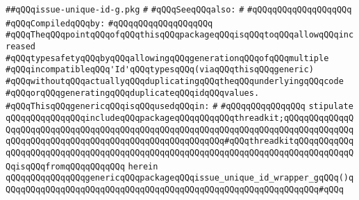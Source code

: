 \label{src/lib/src/issue-unique-id-wrapper-g.pkg}
\verb|##qQQqissue-unique-id-g.pkg|\newline
\verb|#|\newline
\verb|#qQQqSeeqQQqalso:|\newline
\verb|#|\newline
\verb|#qQQqqQQqqQQqqQQqqQQq|\newline
\newline
\verb|#qQQqCompiledqQQqby:|\newline
\verb|#qQQqqQQqqQQqqQQqqQQq|\newline
\newline
\newline
\verb|#qQQqTheqQQqpointqQQqofqQQqthisqQQqpackageqQQqisqQQqtoqQQqallowqQQqincreased|\newline
\verb|#qQQqtypesafetyqQQqbyqQQqallowingqQQqgenerationqQQqofqQQqmultiple|\newline
\verb|#qQQqincompatibleqQQq'Id'qQQqtypesqQQq(viaqQQqthisqQQqgeneric)|\newline
\verb|#qQQqwithoutqQQqactuallyqQQqduplicatingqQQqtheqQQqunderlyingqQQqcode|\newline
\verb|#qQQqorqQQqgeneratingqQQqduplicateqQQqidqQQqvalues.|\newline
\newline
\verb|#qQQqThisqQQqgenericqQQqisqQQqusedqQQqin:|\newline
\verb|#|\newline
\verb|#qQQqqQQqqQQqqQQq|\newline
\newline
\verb|stipulate|\newline
\verb|qQQqqQQqqQQqqQQqincludeqQQqpackageqQQqqQQqqQQqthreadkit;qQQqqQQqqQQqqQQqqQQqqQQqqQQqqQQqqQQqqQQqqQQqqQQqqQQqqQQqqQQqqQQqqQQqqQQqqQQqqQQqqQQqqQQqqQQqqQQqqQQqqQQqqQQqqQQqqQQqqQQqqQQqqQQq#qQQqthreadkitqQQqqQQqqQQqqQQqqQQqqQQqqQQqqQQqqQQqqQQqqQQqqQQqqQQqqQQqqQQqqQQqqQQqqQQqqQQqqQQqqQQqisqQQqfromqQQqqQQqqQQq|\newline
\verb|herein|\newline
\newline
\verb|qQQqqQQqqQQqqQQqgenericqQQqpackageqQQqissue_unique_id_wrapper_gqQQq()qQQqqQQqqQQqqQQqqQQqqQQqqQQqqQQqqQQqqQQqqQQqqQQqqQQqqQQqqQQqqQQq#qQQq|\newline

